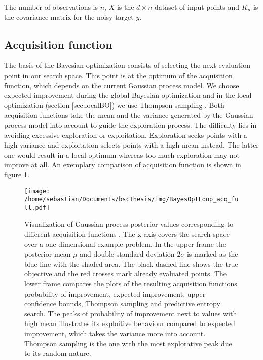 The number of observations is $n$, $X$ is the $d \times n$ dataset of input points and $K_n$ is the covariance matrix for the noisy target $y$.

\subsection{Acquisition function}
The basis of the Bayesian optimization consists of selecting the next evaluation point in our search space. This point is at the optimum of the acquisition function, which depends on the current Gaussian process model. We choose expected improvement \cite{brochu2010tutorial} during the global Bayesian optimization and in the local optimization (section \ref{sec:localBO}) we use Thompson sampling \cite{akrour2017local}. Both acquisition functions take the mean and the variance generated by the Gaussian process model into account to guide the exploration process. The difficulty lies in avoiding excessive exploration or exploitation. Exploration seeks points with a high variance and exploitation selects points with a high mean instead. The latter one would result in a local optimum whereas too much exploration may not improve at all. An exemplary comparison of acquisition function is shown in figure \ref{fig:acqFcn}.

\begin{figure}[h]
    \centering
    \texttt{[image: /home/sebastian/Documents/bscThesis/img/BayesOptLoop\_acq\_full.pdf]}
    \caption{Visualization of Gaussian process posterior values corresponding to different acquisition functions \cite{shahriari2016taking}. The x-axis covers the search space over a one-dimensional example problem. In the upper frame the posterior mean $\mu$ and double standard deviation $2\sigma$ is marked as the blue line with the shaded area. The black dashed line shows the true objective and the red crosses mark already evaluated points. The lower frame compares the plots of the resulting acquisition functions probability of improvement, expected improvement, upper confidence bounds, Thompson sampling and predictive entropy search. The peaks of probability of improvement next to values with high mean illustrates its exploitive behaviour compared to expected improvement, which takes the variance more into account. Thompson sampling is the one with the most explorative peak due to its random nature. \label{fig:acqFcn}}
\end{figure}


